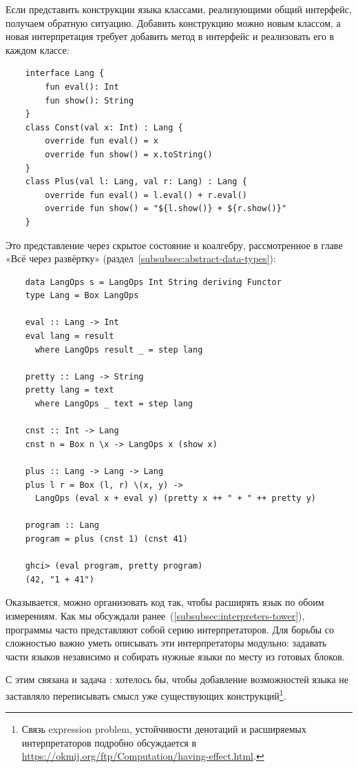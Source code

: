 Если представить конструкции языка классами, реализующими общий интерфейс, получаем обратную ситуацию.
Добавить конструкцию можно новым классом, а новая интерпретация требует добавить метод в интерфейс и реализовать его в каждом классе:
\begin{verbatim}
    interface Lang {
        fun eval(): Int
        fun show(): String
    }
    class Const(val x: Int) : Lang {
        override fun eval() = x
        override fun show() = x.toString()
    }
    class Plus(val l: Lang, val r: Lang) : Lang {
        override fun eval() = l.eval() + r.eval()
        override fun show() = "${l.show()} + ${r.show()}"
    }
\end{verbatim}

Это представление через скрытое состояние и коалгебру, рассмотренное в главе «Всё через развёртку» (раздел~\ref{subsubsec:abstract-data-types}):
\begin{verbatim}
    data LangOps s = LangOps Int String deriving Functor
    type Lang = Box LangOps

    eval :: Lang -> Int
    eval lang = result
      where LangOps result _ = step lang

    pretty :: Lang -> String
    pretty lang = text
      where LangOps _ text = step lang

    cnst :: Int -> Lang
    cnst n = Box n \x -> LangOps x (show x)

    plus :: Lang -> Lang -> Lang
    plus l r = Box (l, r) \(x, y) ->
      LangOps (eval x + eval y) (pretty x ++ " + " ++ pretty y)

    program :: Lang
    program = plus (cnst 1) (cnst 41)

    ghci> (eval program, pretty program)
    (42, "1 + 41")
\end{verbatim}

Оказывается, можно организовать код так, чтобы расширять язык по обоим измерениям.
Как мы обсуждали ранее~(\ref{subsubsec:interpreters-tower}), программы часто представляют собой серию интерпретаторов.
Для борьбы со сложностью важно уметь описывать эти интерпретаторы модульно: задавать части языков независимо и собирать нужные языки по месту из готовых блоков.

С этим связана и задача : хотелось бы, чтобы добавление возможностей языка не заставляло переписывать смысл уже существующих конструкций\footnote{Связь expression problem, устойчивости денотаций и расширяемых интерпретаторов подробно обсуждается в \url{https://okmij.org/ftp/Computation/having-effect.html}.}.

